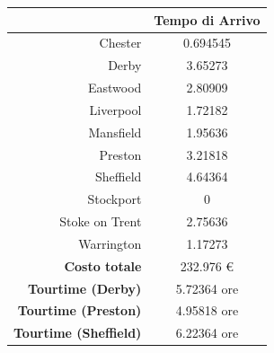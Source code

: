 
		\begin{table}[H]
			\small
			\centering
			\label{table:instance_1_arrival}
			\begin{tabular}{rc}

				\toprule
				& Tempo di Arrivo \\

				\midrule
				Chester & 0.694545 \\
				Derby & 3.65273 \\
				Eastwood & 2.80909 \\
				Liverpool & 1.72182 \\
				Mansfield & 1.95636 \\
				Preston  & 3.21818 \\
				Sheffield & 4.64364 \\
				Stockport & 0 \\
				Stoke on Trent & 2.75636 \\
				Warrington & 1.17273 \\
				\midrule
				\textbf{Costo totale} & 232.976 € \\
				\textbf{Tourtime (Derby)} & 5.72364 ore \\
				\textbf{Tourtime (Preston)} & 4.95818 ore \\
				\textbf{Tourtime (Sheffield)} & 6.22364 ore \\
				\bottomrule
			\end{tabular}
		\end{table}



		
		
